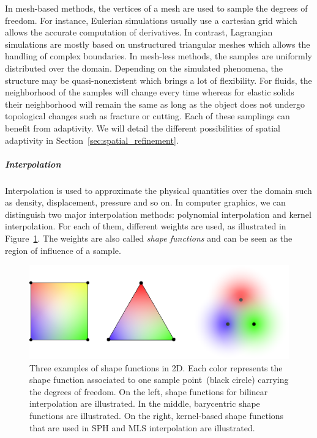 In mesh-based methods, the vertices of a mesh are used to sample the degrees of freedom. For instance, Eulerian simulations usually use a cartesian grid which allows the accurate computation of derivatives. 
In contrast, Lagrangian simulations are mostly based on unstructured triangular meshes which allows the handling of complex boundaries.
In mesh-less methods, the samples are uniformly distributed over the domain. Depending on the simulated phenomena, the structure may be quasi-nonexistent which brings a lot of flexibility. For fluids, the neighborhood of the samples will change every time whereas for elastic solids their neighborhood will remain the same as long as the object does not undergo topological changes such as fracture or cutting.
Each of these samplings can benefit from adaptivity. We will detail the different possibilities of spatial adaptivity in Section~\ref{sec:spatial_refinement}.

\subparagraph{Interpolation}
Interpolation is used to approximate the physical quantities over the domain such as density, displacement, pressure and so on. 
In computer graphics, we can distinguish two major interpolation methods: polynomial interpolation and kernel interpolation.
For each of them, different weights are used, as illustrated in Figure~\ref{fig:shapefunction}. The weights are also called \emph{shape functions} and can be seen as the region of influence of a sample.
\begin{figure}[!h]
	\centering
	\includegraphics[width=\linewidth]{images/continuum_mechanics/shapefunction.png}
	\caption[STAR mechanics: Shape functions]{\label{fig:shapefunction} 
		Three examples of shape functions in 2D. 
		Each color represents the shape function associated to one sample point~(black circle) carrying the degrees of freedom. 
		On the left, shape functions for bilinear interpolation are illustrated. 
		In the middle, barycentric shape functions are illustrated. 
		On the right, kernel-based shape functions that are used in SPH and MLS interpolation are illustrated.}
\end{figure}

